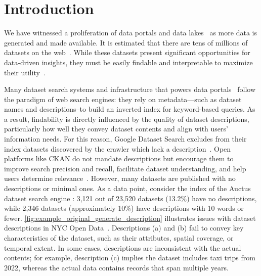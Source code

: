 \vspace{-0.15cm}
\section{Introduction}
\label{sec:intro}

We have witnessed a proliferation of data portals and data lakes~\cite{gregory2022human, figshare, zenodo, dataverse, hendler2012datagov, kassen2013opendata_chicago, NYC_opendata,nargesian2019data} as more data is generated and made available. It is estimated that there are tens of millions of datasets on the web~\cite{google-dataset-analysis}.
While these datasets present significant opportunities for data-driven insights, they must be easily findable and interpretable to maximize their utility~\cite{wilkinson2016fair}.

Many dataset search systems and infrastructure that powers data portals~\cite{brickley2019google, CKAN, socrata} follow the paradigm of web search engines: they rely on metadata—such as dataset names and descriptions--to build an inverted index for keyword-based queries. As a result, findability is directly influenced by the quality of dataset descriptions, particularly how well they convey dataset contents and align with users’ information needs.
%
For this reason, Google Dataset Search excludes from their index datasets discovered by the crawler which lack a description~\cite{benjelloun2020google}. 
%
Open platforms like CKAN do not mandate descriptions but encourage them to improve search precision and recall, facilitate dataset understanding, and help users determine relevance~\cite{CKAN_description}.
% 
However, many datasets are published with no descriptions or minimal ones. 
As a data point, consider the index of the Auctus dataset search engine \cite{castelo2021auctus}: 3,121 out of 23,520 datasets (13.2\%) have no descriptions, while 2,346 datasets (approximately 10\%) have descriptions with 10 words or fewer. 
% 
\autoref{fig:example_original_generate_description} illustrates issues with dataset descriptions in NYC Open Data~\cite{NYC_opendata}. Descriptions (a) and (b) fail to convey key characteristics of the dataset, such as their attributes, spatial coverage, or temporal extent.
% 
% 
In some cases, descriptions are inconsistent with the actual contents; for example,  description (c) implies the dataset includes taxi trips from 2022, whereas the actual data contains records that span multiple years.

